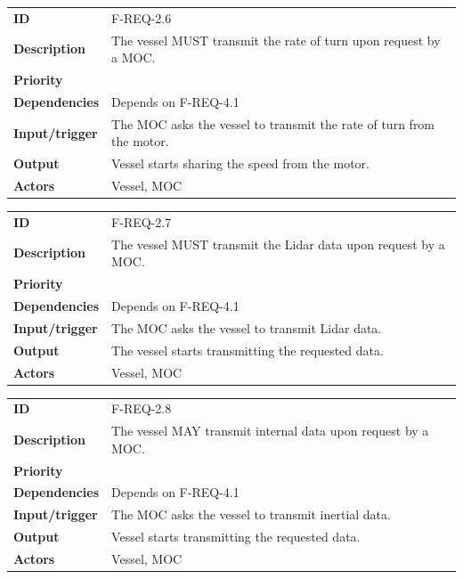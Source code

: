 \begin{table}[H]
	\centering
	\begin{tabularx}{\textwidth}{ l X }
		\rowcolor[HTML]{E7E7E7}
		\textbf{ID} & F-REQ-2.6 \\
		\textbf{Description} & The vessel MUST transmit the rate of turn upon request by a MOC. \\
		\rowcolor[HTML]{E7E7E7}
		\textbf{Priority} & \priohigh \\
		\textbf{Dependencies} & Depends on F-REQ-4.1 \\
		\rowcolor[HTML]{E7E7E7}
		\textbf{Input/trigger} & The MOC asks the vessel to transmit the rate of turn from the motor. \\
		\textbf{Output} & Vessel starts sharing the speed from the motor. \\
		\rowcolor[HTML]{E7E7E7}
		\textbf{Actors} & Vessel, MOC \\
	\end{tabularx}
	\label{table:f-req-2.6}
\end{table}

\begin{table}[H]
	\centering
	\begin{tabularx}{\textwidth}{ l X }
		\rowcolor[HTML]{E7E7E7}
		\textbf{ID} & F-REQ-2.7 \\
		\textbf{Description} & The vessel MUST transmit the Lidar data upon request by a MOC. \\
		\rowcolor[HTML]{E7E7E7}
		\textbf{Priority} & \priohigh \\
		\textbf{Dependencies} & Depends on F-REQ-4.1 \\
		\rowcolor[HTML]{E7E7E7}
		\textbf{Input/trigger} & The MOC asks the vessel to transmit Lidar data. \\
		\textbf{Output} & The vessel starts transmitting the requested data. \\
		\rowcolor[HTML]{E7E7E7}
		\textbf{Actors} & Vessel, MOC \\
	\end{tabularx}
	\label{table:f-req-2.7}
\end{table}

\begin{table}[H]
	\centering
	\begin{tabularx}{\textwidth}{ l X }
		\rowcolor[HTML]{E7E7E7}
		\textbf{ID} & F-REQ-2.8 \\
		\textbf{Description} & The vessel MAY transmit internal data upon request by a MOC. \\
		\rowcolor[HTML]{E7E7E7}
		\textbf{Priority} & \prioopt \\
		\textbf{Dependencies} & Depends on F-REQ-4.1 \\
		\rowcolor[HTML]{E7E7E7}
		\textbf{Input/trigger} & The MOC asks the vessel to transmit inertial data. \\
		\textbf{Output} & Vessel  starts transmitting the requested data. \\
		\rowcolor[HTML]{E7E7E7}
		\textbf{Actors} & Vessel, MOC \\
	\end{tabularx}
	\label{table:f-req-2.8}
\end{table}

